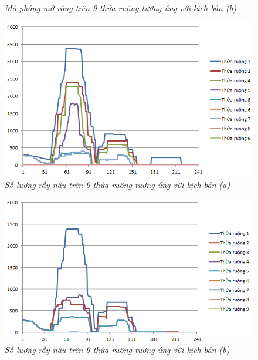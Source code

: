 \documentclass[13pt]{extreport}
\begin{document}
{\begin{figure}
\begin{minipage}[b]{0.5\linewidth}
\caption{ \textit{Mô phỏng mở rộng trên 9 thửa ruộng tương ứng với kịch bản (b)} }
\end{minipage}
\end{figure}


\begin{figure}%
\begin{center}
\includegraphics[scale=0.8]{kq9a}
\end{center}
\caption{ \textit{Số lượng rầy nâu trên 9 thửa ruộng tương ứng với kịch bản (a)}}
\end{figure}

\begin{figure}%
\begin{center}
\includegraphics[scale=0.8]{kq9b}
\end{center}
\caption{\textit{Số lượng rầy nâu trên 9 thửa ruộng tương ứng với kịch bản (b)} }
\end{figure}



}
\end{document}
